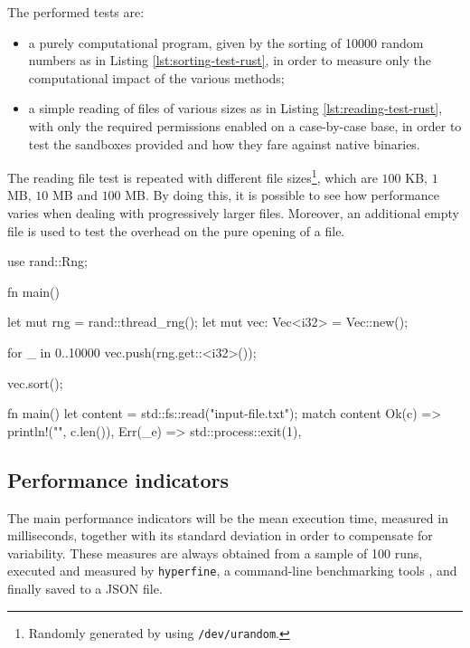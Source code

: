 The performed tests are:
\begin{itemize}
  \item a purely computational program, given by the sorting of 10000 random numbers as in Listing \ref{lst:sorting-test-rust},
        in order to measure only the computational impact of the various methods;
  \item a simple reading of files of various sizes as in Listing \ref{lst:reading-test-rust}, with only the required permissions enabled on
        a case-by-case base, in order to test the sandboxes provided and how they fare against native binaries.
\end{itemize}

The reading file test is repeated with different file sizes\footnote{Randomly generated by using \texttt{/dev/urandom}.},
which are $100$ KB, $1$ MB, $10$ MB and $100$ MB. By doing this, it is possible to see how performance
varies when dealing with progressively larger files. Moreover, an additional empty file is used to
test the overhead on the pure opening of a file.

\vspace*{0.5cm}
\begin{code}[language=Rust, caption=The ``sorting program''., label=lst:sorting-test-rust]
use rand::Rng;

fn main() {
  let mut rng = rand::thread_rng();
  let mut vec: Vec<i32> = Vec::new();

  for _ in 0..10000 {
    vec.push(rng.get::<i32>());
  }

  vec.sort();
}
\end{code}

\begin{code}[language=Rust, caption=The ``reading program''., label=lst:reading-test-rust]
fn main() {
  let content = std::fs::read("input-file.txt");
  match content {
      Ok(c) => println!("{}", c.len()),
      Err(_e) => std::process::exit(1),
  }
}
\end{code}

\subsection{Performance indicators}

The main performance indicators will be the mean execution time, measured in milliseconds, together with its
standard deviation in order to compensate for variability.
These measures are always obtained from a sample of 100 runs, executed and measured by \texttt{hyperfine},
a command-line benchmarking tools \cite{hyperfine}, and finally saved to a
JSON file.

